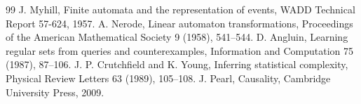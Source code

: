 \documentclass[11pt,a4paper]{article}
\begin{document}
\begin{thebibliography}{99}
 J. Myhill, Finite automata and the representation of events, WADD Technical Report 57-624, 1957.
 A. Nerode, Linear automaton transformations, Proceedings of the American Mathematical Society 9 (1958), 541--544.
 D. Angluin, Learning regular sets from queries and counterexamples, Information and Computation 75 (1987), 87--106.
 J. P. Crutchfield and K. Young, Inferring statistical complexity, Physical Review Letters 63 (1989), 105--108.
 J. Pearl, Causality, Cambridge University Press, 2009.
\end{thebibliography}
\end{document}
